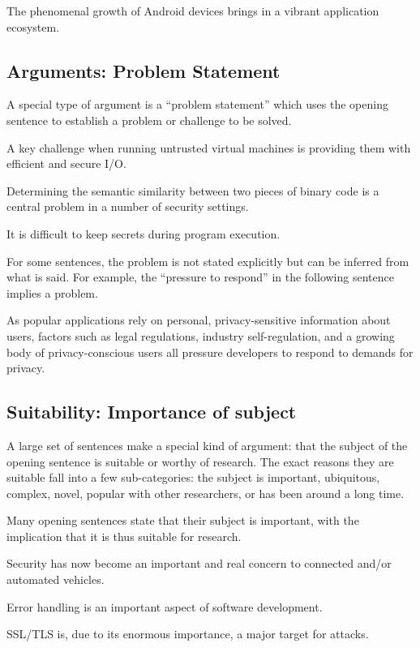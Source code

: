 \documentclass[sigconf]{acmart}
\begin{document}
	The phenomenal growth of Android devices brings in a vibrant application ecosystem.
	
\subsection{Arguments: Problem Statement }
	
	A special type of argument is a “problem statement” which uses the opening sentence to establish a problem or challenge to be solved. 
	
	A key challenge when running untrusted virtual machines is providing them with efficient and secure I/O.
	
	Determining the semantic similarity between two pieces of binary code is a central problem in a number of security settings.
	
	It is difficult to keep secrets during program execution.
	
	For some sentences, the problem is not stated explicitly but can be inferred from what is said. For example, the “pressure to respond” in the following sentence implies a problem.
	
	As popular applications rely on personal, privacy-sensitive information about users, factors such as legal regulations, industry self-regulation, and a growing body of privacy-conscious users all pressure developers to respond to demands for privacy.
	
\subsection{Suitability: Importance of subject}
	
	A large set of sentences make a special kind of argument: that the subject of the opening sentence is suitable or worthy of research. The exact reasons they are suitable fall into a few sub-categories: the subject is important, ubiquitous, complex, novel, popular with other researchers, or has been around a long time. 
	
	Many opening sentences state that their subject is important, with the implication that it is thus suitable for research.
	
	Security has now become an important and real concern to connected and/or automated vehicles.
	
	Error handling is an important aspect of software development.
	
	SSL/TLS is, due to its enormous importance, a major target for attacks.
	
\end{document}
